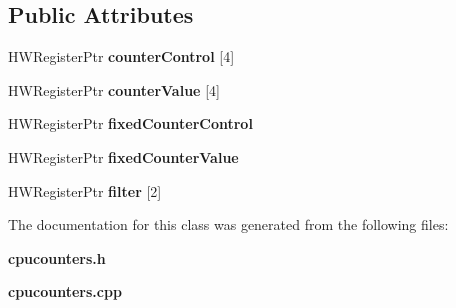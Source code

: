 \subsection*{Public Attributes}
\begin{DoxyCompactItemize}
\item 
\mbox{\label{classUncorePMU_a4170bbe061a36181da2322792c436984}} 
H\+W\+Register\+Ptr {\bfseries counter\+Control} [4]
\item 
\mbox{\label{classUncorePMU_acc15d14db330e1bf089dbf2715804d52}} 
H\+W\+Register\+Ptr {\bfseries counter\+Value} [4]
\item 
\mbox{\label{classUncorePMU_affe52ec3e8a195ff6ee259c85f29fc8b}} 
H\+W\+Register\+Ptr {\bfseries fixed\+Counter\+Control}
\item 
\mbox{\label{classUncorePMU_aec56b0470ce6546765b8dc8bc1ec0b89}} 
H\+W\+Register\+Ptr {\bfseries fixed\+Counter\+Value}
\item 
\mbox{\label{classUncorePMU_a24afbba3413021992445b27059cf1113}} 
H\+W\+Register\+Ptr {\bfseries filter} [2]
\end{DoxyCompactItemize}


The documentation for this class was generated from the following files\+:\begin{DoxyCompactItemize}
\item 
\textbf{ cpucounters.\+h}\item 
\textbf{ cpucounters.\+cpp}\end{DoxyCompactItemize}
